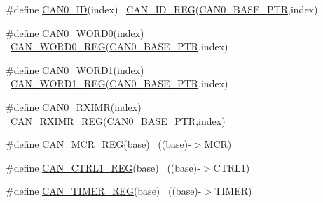 \begin{DoxyCompactItemize}
\item 
\#define \hyperlink{group___c_a_n___register___accessor___macros_gac7b043c2201389dfe416e3f5166db6cc}{C\+A\+N0\+\_\+\+ID}(index)                                                  ~\hyperlink{group___c_a_n___register___accessor___macros_ga081389bb65f5ba1945fa2984d057044e}{C\+A\+N\+\_\+\+I\+D\+\_\+\+R\+EG}(\hyperlink{group___c_a_n___peripheral_ga1ee8f499e10af9b8e3132e0168e519b9}{C\+A\+N0\+\_\+\+B\+A\+S\+E\+\_\+\+P\+TR},index)
\item 
\#define \hyperlink{group___c_a_n___register___accessor___macros_gaa0a859ba1ce74eaa3d818f7f3c33b81c}{C\+A\+N0\+\_\+\+W\+O\+R\+D0}(index)                                            ~\hyperlink{group___c_a_n___register___accessor___macros_gab486ab7c313c1c3ab3ea1d146a4e4597}{C\+A\+N\+\_\+\+W\+O\+R\+D0\+\_\+\+R\+EG}(\hyperlink{group___c_a_n___peripheral_ga1ee8f499e10af9b8e3132e0168e519b9}{C\+A\+N0\+\_\+\+B\+A\+S\+E\+\_\+\+P\+TR},index)
\item 
\#define \hyperlink{group___c_a_n___register___accessor___macros_ga4af1bfb5724c2c008255212b870e19f1}{C\+A\+N0\+\_\+\+W\+O\+R\+D1}(index)                                            ~\hyperlink{group___c_a_n___register___accessor___macros_gabea0fd7f957d3c4e7770f1670aff54dc}{C\+A\+N\+\_\+\+W\+O\+R\+D1\+\_\+\+R\+EG}(\hyperlink{group___c_a_n___peripheral_ga1ee8f499e10af9b8e3132e0168e519b9}{C\+A\+N0\+\_\+\+B\+A\+S\+E\+\_\+\+P\+TR},index)
\item 
\#define \hyperlink{group___c_a_n___register___accessor___macros_ga90e907f58584ed65f8c8cd1ab79e4fc4}{C\+A\+N0\+\_\+\+R\+X\+I\+MR}(index)                                            ~\hyperlink{group___c_a_n___register___accessor___macros_gabcdb674583aff011e9cae0837f6abd5a}{C\+A\+N\+\_\+\+R\+X\+I\+M\+R\+\_\+\+R\+EG}(\hyperlink{group___c_a_n___peripheral_ga1ee8f499e10af9b8e3132e0168e519b9}{C\+A\+N0\+\_\+\+B\+A\+S\+E\+\_\+\+P\+TR},index)
\item 
\#define \hyperlink{group___c_a_n___register___accessor___macros_ga266f3270836a0e2113e665b27e8469c3}{C\+A\+N\+\_\+\+M\+C\+R\+\_\+\+R\+EG}(base)                                            ~((base)-\/$>$M\+CR)
\item 
\#define \hyperlink{group___c_a_n___register___accessor___macros_gacb8258cf058657f2e55abcfb40b99344}{C\+A\+N\+\_\+\+C\+T\+R\+L1\+\_\+\+R\+EG}(base)                                        ~((base)-\/$>$C\+T\+R\+L1)
\item 
\#define \hyperlink{group___c_a_n___register___accessor___macros_ga1fed1cd31d16a8d3472d1f4f424b4fc8}{C\+A\+N\+\_\+\+T\+I\+M\+E\+R\+\_\+\+R\+EG}(base)                                        ~((base)-\/$>$T\+I\+M\+ER)

\end{DoxyCompactItemize}
